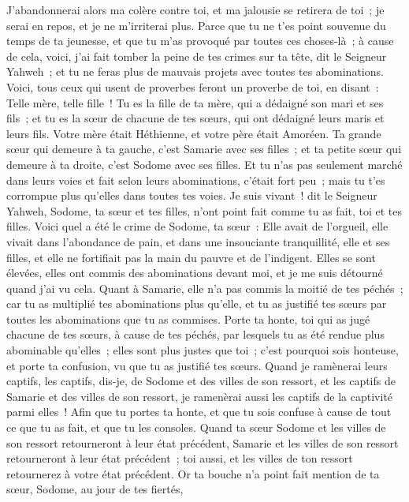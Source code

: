 \begin{multicols}{2}
J'abandonnerai alors ma colère contre toi, et ma jalousie se retirera de toi~; je serai en repos, et je ne m'irriterai plus.
Parce que tu ne t'es point souvenue du temps de ta jeunesse, et que tu m'as provoqué par toutes ces choses-là~; à cause de cela, voici, j'ai fait tomber la peine de tes crimes sur ta tête, dit le Seigneur Yahweh~; et tu ne feras plus de mauvais projets avec toutes tes abominations.
Voici, tous ceux qui usent de proverbes feront un proverbe de toi, en disant~: Telle mère, telle fille~!
Tu es la fille de ta mère, qui a dédaigné son mari et ses fils~; et tu es la sœur de chacune de tes sœurs, qui ont dédaigné leurs maris et leurs fils. Votre mère était Héthienne, et votre père était Amoréen.
Ta grande sœur qui demeure à ta gauche, c'est Samarie avec ses filles~; et ta petite sœur qui demeure à ta droite, c'est Sodome avec ses filles.
Et tu n'as pas seulement marché dans leurs voies et fait selon leurs abominations, c'était fort peu~; mais tu t'es corrompue plus qu'elles dans toutes tes voies.
Je suis vivant~! dit le Seigneur Yahweh, Sodome, ta sœur et tes filles, n'ont point fait comme tu as fait, toi et tes filles.
Voici quel a été le crime de Sodome, ta sœur~: Elle avait de l'orgueil, elle vivait dans l'abondance de pain, et dans une insouciante tranquillité, elle et ses filles, et elle ne fortifiait pas la main du pauvre et de l'indigent.
Elles se sont élevées, elles ont commis des abominations devant moi, et je me suis détourné quand j'ai vu cela.
Quant à Samarie, elle n'a pas commis la moitié de tes péchés~; car tu as multiplié tes abominations plus qu'elle, et tu as justifié tes sœurs par toutes les abominations que tu as commises.
Porte ta honte, toi qui as jugé chacune de tes sœurs, à cause de tes péchés, par lesquels tu as été rendue plus abominable qu'elles~; elles sont plus justes que toi~; c'est pourquoi sois honteuse, et porte ta confusion, vu que tu as justifié tes sœurs.
Quand je ramènerai leurs captifs, les captifs, dis-je, de Sodome et des villes de son ressort, et les captifs de Samarie et des villes de son ressort, je ramenèrai aussi les captifs de la captivité parmi elles~!
Afin que tu portes ta honte, et que tu sois confuse à cause de tout ce que tu as fait, et que tu les consoles.
Quand ta sœur Sodome et les villes de son ressort retourneront à leur état précédent, Samarie et les villes de son ressort retourneront à leur état précédent~; toi aussi, et les villes de ton ressort retournerez à votre état précédent.
Or ta bouche n'a point fait mention de ta sœur, Sodome, au jour de tes fiertés,

\end{multicols}
